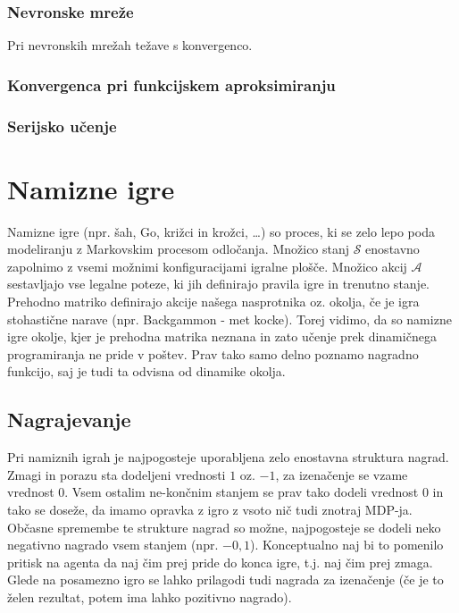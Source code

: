\documentclass[12pt,a4paper]{amsart}
\theoremstyle{definition} %
\theoremstyle{plain} %
\begin{document}
\subsubsection{Nevronske mreže}
Pri nevronskih mrežah težave s konvergenco.

\subsubsection{Konvergenca pri funkcijskem aproksimiranju}

\subsubsection{Serijsko učenje}


\section{Namizne igre}
Namizne igre (npr. šah, Go, križci in krožci, \dots) so proces, ki se zelo lepo poda modeliranju z 
Markovskim procesom odločanja. Množico stanj $\mathcal{S}$ enostavno zapolnimo z vsemi možnimi 
konfiguracijami igralne plošče. Množico akcij $\mathcal{A}$ sestavljajo vse legalne poteze, ki jih 
definirajo pravila igre in trenutno stanje. Prehodno matriko definirajo akcije našega nasprotnika oz. 
okolja, če je igra stohastične narave (npr. Backgammon - met kocke). Torej vidimo, da so namizne igre
okolje, kjer je prehodna matrika neznana in zato učenje prek dinamičnega programiranja ne pride v 
poštev. Prav tako samo delno poznamo nagradno funkcijo, saj je tudi ta odvisna od dinamike okolja.  

\subsection{Nagrajevanje}
Pri namiznih igrah je najpogosteje uporabljena zelo enostavna struktura nagrad. Zmagi in porazu sta 
dodeljeni vrednosti $1$ oz. $-1$, za izenačenje se vzame vrednost $0$. Vsem ostalim ne-končnim stanjem
se prav tako dodeli vrednost $0$ in tako se doseže, da imamo opravka z igro z vsoto nič tudi znotraj 
MDP-ja. Občasne spremembe te strukture nagrad so možne, najpogosteje se dodeli neko negativno nagrado 
vsem stanjem (npr. $-0,1$). Konceptualno naj bi to pomenilo pritisk na agenta da naj čim prej pride do 
konca igre, t.j. naj čim prej zmaga. Glede na posamezno igro se lahko prilagodi tudi nagrada za 
izenačenje (če je to želen rezultat, potem ima lahko pozitivno nagrado).
\end{document}
